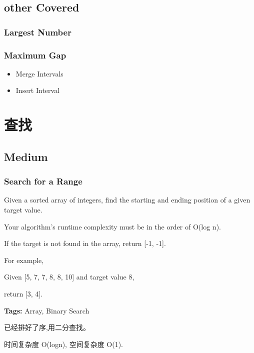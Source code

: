 \documentclass[12pt]{book}
\begin{document}
\section{other Covered}
\label{sec-7-4}
\subsection{Largest Number}
\label{sec-7-4-1}
\subsection{Maximum Gap}
\label{sec-7-4-2}
\begin{itemize}
\item Merge Intervals
\item Insert Interval
\end{itemize}
\chapter{查找}
\label{sec-8}
\section{Medium}
\label{sec-8-1}
\subsection{Search for a Range}
\label{sec-8-1-1}
Given a sorted array of integers, find the starting and ending position of a given target value.

Your algorithm's runtime complexity must be in the order of O(log n).

If the target is not found in the array, return [-1, -1].

For example,

Given [5, 7, 7, 8, 8, 10] and target value 8,

return [3, 4].

\textbf{Tags:} Array, Binary Search

已经排好了序,用二分查找。

时间复杂度 O(logn), 空间复杂度 O(1). 
\end{document}
